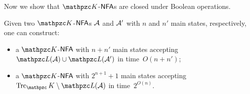 Now we show that $\Ku$-$\text{\sffamily NFA}$s are closed under Boolean operations.

\begin{proposition}\label{prop:booleanClosureNFA} 
Given two $\Ku$-$\text{\sffamily NFA}$s  $\mathcal{A}$ and $\mathcal{A}'$   with $n$ and $n'$ main states, respectively, 
one can construct:
\begin{itemize}
  \item a  $\Ku$-$\text{\sffamily NFA}$ with $n+n'$ main states accepting $\Lang(\Au)\cup \Lang(\Au')$ in time~\mbox{$O(n+n')$};
   \item a $\Ku$-$\text{\sffamily NFA}$ with $2^{n+1}+1$ main states accepting   $\Trk_\Ku\setminus \Lang(\Au)$ in time~$2^{O(n)}$.
\end{itemize}
\end{proposition}
